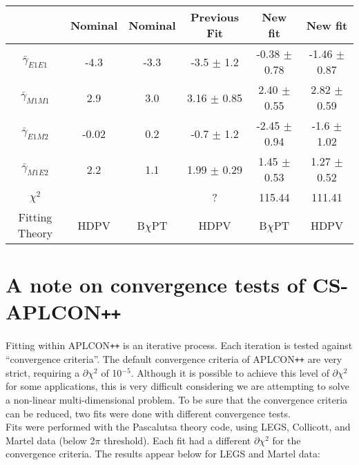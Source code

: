\documentclass[]{article}
\begin{document}
\begin{table}[h!]
	\centering %
	\begin{tabular}{|c|cc|c|c|c|} %
		\hline
		                    & Nominal & Nominal & Previous Fit & New fit & New fit\\
		\hline %
		$\bar{\gamma}_{E1E1}$ & -4.3 & -3.3 & -3.5 $\pm$ 1.2 & -0.38 $\pm$ 0.78 & -1.46 $\pm$ 0.87 \\ 
		$\bar{\gamma}_{M1M1}$ & 2.9 & 3.0 & 3.16 $\pm$ 0.85 & 2.40 $\pm$ 0.55 & 2.82 $\pm$ 0.59 \\
		$\bar{\gamma}_{E1M2}$ & -0.02 & 0.2 & -0.7 $\pm$ 1.2 & -2.45 $\pm$ 0.94 & -1.6 $\pm$ 1.02 \\
		$\bar{\gamma}_{M1E2}$ & 2.2 & 1.1 & 1.99 $\pm$ 0.29 & 1.45 $\pm$ 0.53 & 1.27 $\pm$ 0.52 \\[0.5ex]
		$\chi^{2}$    &     &       &  ?              & 115.44 & 111.41 \\[0.5ex]	
		\hline
		Fitting Theory & HDPV & B$\chi$PT & HDPV & B$\chi$PT& HDPV\\
		\hline
	\end{tabular}
\end{table}

\newpage 
\section{A note on convergence tests of CS-APLCON\texttt{++}}\label{Section:Convergence}

Fitting within APLCON\texttt{++} is an iterative process. Each iteration is tested against \enquote{convergence criteria}. The default convergence criteria of APLCON\texttt{++} are very strict, requiring a $\partial\chi^{2}$ of 10$^{-5}$. Although it is possible to achieve this level of $\partial\chi^{2}$ for some applications, this is very difficult considering we are attempting to solve a non-linear multi-dimensional problem. To be sure that the convergence criteria can be reduced, two fits were done with different convergence tests. \\

\noindent Fits were performed with the Pascalutsa theory code, using LEGS, Collicott, and Martel data (below 2$\pi$ threshold). Each fit had a different $\partial\chi^{2}$ for the convergence criteria. The results appear below for LEGS and Martel data:
 
\end{document}

